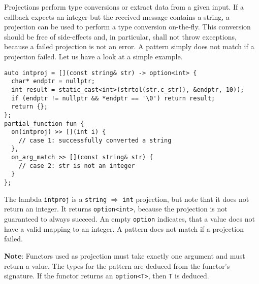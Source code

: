 Projections perform type conversions or extract data from a given input.
If a callback expects an integer but the received message contains a string, a projection can be used to perform a type conversion on-the-fly.
This conversion should be free of side-effects and, in particular, shall not throw exceptions, because a failed projection is not an error.
A pattern simply does not match if a projection failed.
Let us have a look at a simple example.

\begin{lstlisting}
auto intproj = [](const string& str) -> option<int> {
  char* endptr = nullptr;
  int result = static_cast<int>(strtol(str.c_str(), &endptr, 10));
  if (endptr != nullptr && *endptr == '\0') return result;
  return {};
};
partial_function fun {
  on(intproj) >> [](int i) {
    // case 1: successfully converted a string
  },
  on_arg_match >> [](const string& str) {
    // case 2: str is not an integer
  }
};
\end{lstlisting}

The lambda \lstinline^intproj^ is a \lstinline^string^ $\Rightarrow$ \lstinline^int^ projection, but note that it does not return an integer.
It returns \lstinline^option<int>^, because the projection is not guaranteed to always succeed.
An empty \lstinline^option^ indicates, that a value does not have a valid mapping to an integer.
A pattern does not match if a projection failed.

\textbf{Note}: Functors used as projection must take exactly one argument and must return a value.
The types for the pattern are deduced from the functor's signature.
If the functor returns an \lstinline^option<T>^, then \lstinline^T^ is deduced.











